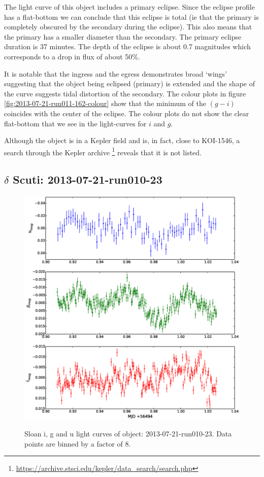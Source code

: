 The light curve of this object includes a primary eclipse. Since the eclipse profile has a flat-bottom we can conclude that this eclipse is total (ie that the primary is completely obscured by the secondary during the eclipse). This also means that the primary has a smaller diameter than the secondary. The primary eclipse duration is 37 minutes. The depth of the eclipse is about 0.7 magnitudes which corresponds to a drop in flux of about 50\%. 

It is notable that the ingress and the egress demonstrates broad `wings' suggesting that the object being eclipsed (primary) is extended and the shape of the curve suggests tidal distortion of the secondary. The colour plots in figure \ref{fig:2013-07-21-run011-162-colour} show that the minimum of the $(g-i)$ coincides with the center of the eclipse. The colour plots do not show the clear flat-bottom that we see in the light-curves for $i$ and $g$. 

Although the object is in a Kepler field and is, in fact, close to KOI-1546, a search through the Kepler archive \footnote{\url{https://archive.stsci.edu/kepler/data_search/search.php}} reveals that it is not listed. 

\subsection{$\delta$ Scuti: 2013-07-21-run010-23}

\begin{figure}
  \center
  \includegraphics[width=120mm]{images/2013-07-21-run010-23_lightcurve-bin8.eps} \\
  \caption{Sloan i, g and u light curves of object: 2013-07-21-run010-23. Data points are binned by a factor of 8.}
  \label{fig:2013-07-21-run010-23}
\end{figure}

